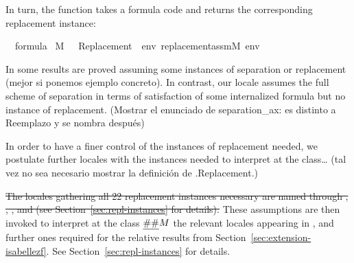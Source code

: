 In turn, the  function
takes a formula code and returns the corresponding replacement
instance:
\begin{isabelle}
{\isasymphi}\ {\isasymin}\ formula\ {\isasymLongrightarrow}\isanewline
{\isacharparenleft}{\kern0pt}M{\isacharcomma}{\kern0pt}\ {\isacharbrackleft}{\kern0pt}{\isacharbrackright}{\kern0pt}\ {\isasymTurnstile}\ {\isasymcdot}Replacement{\isacharparenleft}{\kern0pt}{\isasymphi}{\isacharparenright}{\kern0pt}{\isasymcdot}{\isacharparenright}{\kern0pt}\ {\isasymlongleftrightarrow}\ {\isacharparenleft}{\kern0pt}{\isasymforall}env{\isachardot}{\kern0pt}\ replacement{\isacharunderscore}{\kern0pt}assm{\isacharparenleft}{\kern0pt}M{\isacharcomma}{\kern0pt}\ env{\isacharcomma}{\kern0pt}\ {\isasymphi}{\isacharparenright}{\kern0pt}{\isacharparenright}
\end{isabelle}

In  some results are proved assuming some instances of
separation or replacement (mejor si ponemos ejemplo concreto). In contrast,
our locale  assumes the full scheme of separation in terms
of satisfaction of some internalized formula but no instance of replacement. (Mostrar el enunciado de separation\_ax:
es distinto a Reemplazo y se nombra después)

In order to have a finer control of the instances of replacement needed,
we postulate further locales with the instances needed to interpret at
the class\dots
(tal vez no sea necesario mostrar la definición de .Replacement.)

%

\sout{The locales gathering all 22 replacement instances necessary are named
 through ,
,
, and
 (see
Section~\ref{sec:repl-instances} for details).}
These assumptions are then invoked to interpret at the class
$\isatt{\#\#} M$ the relevant locales appearing in
, and further ones required for the relative
results from Section~\ref{sec:extension-isabellezf}. See
Section~\ref{sec:repl-instances} for details.

